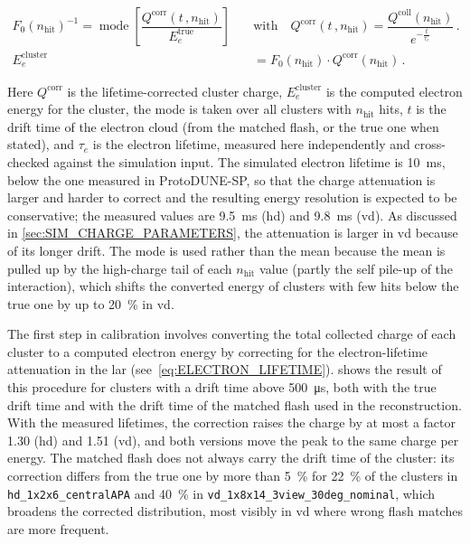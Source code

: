 \begin{align}
    F_0(n_\text{hit})^{-1} = \operatorname{mode}\left[\dfrac{Q^\text{corr}(t\,,n_\text{hit})}{E^\text{true}_e}\right] \quad &\text{with} \quad Q^\text{corr}(t\,,n_\text{hit}) = \dfrac{Q^\text{coll}(n_\text{hit})}{e^{-\frac{t}{\tau_e}}}\,. \\
    E^\text{cluster}_e &= F_0(n_\text{hit}) \cdot Q^\text{corr}(n_\text{hit})\,.
\end{align}\label{eq:ELECTRON_LIFETIME}

Here \( Q^\text{corr} \) is the lifetime-corrected cluster charge, \( E^\text{cluster}_e \) is the computed electron energy for the cluster, the mode is taken over all clusters with \( n_\text{hit} \) hits, \( t \) is the drift time of the electron cloud (from the matched flash, or the true one when stated), and \( \tau_e \) is the electron lifetime, measured here independently and cross-checked against the simulation input. The simulated electron lifetime is \SI{10}{\milli\second}, below the one measured in ProtoDUNE-SP, so that the charge attenuation is larger and harder to correct and the resulting energy resolution is expected to be conservative; the measured values are \SI{9.5}{\milli\second} (\gls{hd}) and \SI{9.8}{\milli\second} (\gls{vd}). As discussed in \cref{sec:SIM_CHARGE_PARAMETERS}, the attenuation is larger in \gls{vd} because of its longer drift. The mode is used rather than the mean because the mean is pulled up by the high-charge tail of each $n_\text{hit}$ value (partly the self pile-up of the interaction), which shifts the converted energy of clusters with few hits below the true one by up to \SI{20}{\percent} in \gls{vd}.

The first step in calibration involves converting the total collected charge of each cluster to a computed electron energy by correcting for the electron-lifetime attenuation in the \gls{lar} (see~\cref{eq:ELECTRON_LIFETIME}).  shows the result of this procedure for clusters with a drift time above \SI{500}{\micro\second}, both with the true drift time and with the drift time of the matched flash used in the reconstruction. With the measured lifetimes, the correction raises the charge by at most a factor \num{1.30} (\gls{hd}) and \num{1.51} (\gls{vd}), and both versions move the peak to the same charge per energy. The matched flash does not always carry the drift time of the cluster: its correction differs from the true one by more than \SI{5}{\percent} for \SI{22}{\percent} of the clusters in \texttt{hd\_1x2x6\_centralAPA} and \SI{40}{\percent} in \texttt{vd\_1x8x14\_3view\_30deg\_nominal}, which broadens the corrected distribution, most visibly in \gls{vd} where wrong flash matches are more frequent.

